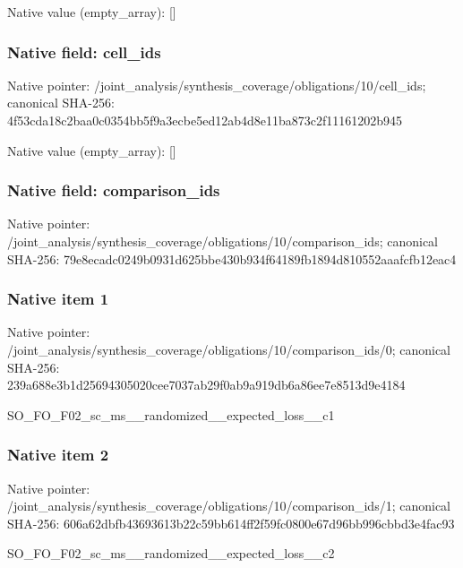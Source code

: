 \documentclass[10pt,a4paper]{article}
\begin{document}
Native value (empty\_\allowbreak{}array): []

\subsubsection{Native field: cell\_\allowbreak{}ids}
Native pointer: /joint\_\allowbreak{}analysis/synthesis\_\allowbreak{}coverage/obligations/10/cell\_\allowbreak{}ids; canonical SHA-256: 4f53cda18c2baa0c0354bb5f9a3ecbe5ed12ab4d8e11ba873c2f11161202b945

Native value (empty\_\allowbreak{}array): []

\subsubsection{Native field: comparison\_\allowbreak{}ids}
Native pointer: /joint\_\allowbreak{}analysis/synthesis\_\allowbreak{}coverage/obligations/10/comparison\_\allowbreak{}ids; canonical SHA-256: 79e8ecadc0249b0931d625bbe430b934f64189fb1894d810552aaafcfb12eac4

\subsubsection{Native item 1}
Native pointer: /joint\_\allowbreak{}analysis/synthesis\_\allowbreak{}coverage/obligations/10/comparison\_\allowbreak{}ids/0; canonical SHA-256: 239a688e3b1d25694305020cee7037ab29f0ab9a919db6a86ee7e8513d9e4184

\begingroup\raggedright\sloppy SO\_\allowbreak{}FO\_\allowbreak{}F02\_\allowbreak{}sc\_\allowbreak{}ms\_\allowbreak{}\_\allowbreak{}randomized\_\allowbreak{}\_\allowbreak{}expected\_\allowbreak{}loss\_\allowbreak{}\_\allowbreak{}c1\par\endgroup

\subsubsection{Native item 2}
Native pointer: /joint\_\allowbreak{}analysis/synthesis\_\allowbreak{}coverage/obligations/10/comparison\_\allowbreak{}ids/1; canonical SHA-256: 606a62dbfb43693613b22c59bb614ff2f59fc0800e67d96bb996cbbd3e4fac93

\begingroup\raggedright\sloppy SO\_\allowbreak{}FO\_\allowbreak{}F02\_\allowbreak{}sc\_\allowbreak{}ms\_\allowbreak{}\_\allowbreak{}randomized\_\allowbreak{}\_\allowbreak{}expected\_\allowbreak{}loss\_\allowbreak{}\_\allowbreak{}c2\par\endgroup
\end{document}
